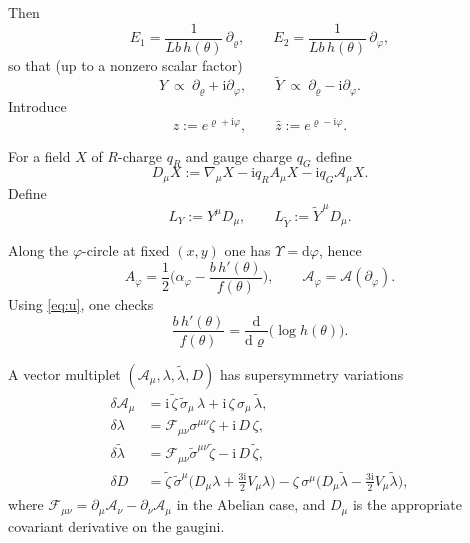 \documentclass[11pt,a4paper]{article}
\numberwithin{equation}{section}
\theoremstyle{plain}
\theoremstyle{definition}
\theoremstyle{remark}
\newcommand{\ii}{\mathrm{i}}
\newcommand{\dd}{\mathrm{d}}
\newcommand{\nn}{\nonumber}
\begin{document}
Then
\[
E_1=\frac{1}{L b\,h(\theta)}\,\partial_\varrho,
\qquad
E_2=\frac{1}{L b\,h(\theta)}\,\partial_\varphi,
\]
so that (up to a nonzero scalar factor)
\begin{equation}
Y \ \propto\ \partial_\varrho+\ii\partial_\varphi,
\qquad
\widetilde Y \ \propto\ \partial_\varrho-\ii\partial_\varphi.
\label{eq:Ydir}
\end{equation}
Introduce
\begin{equation}
z:=e^{\varrho+\ii\varphi},\qquad \bar z:=e^{\varrho-\ii\varphi}.
\label{eq:z}
\end{equation}

For a field $X$ of $R$-charge $q_R$ and gauge charge $q_G$ define
\begin{equation}
D_\mu X := \nabla_\mu X - \ii q_R A_\mu X - \ii q_G \mathcal A_\mu X.
\label{eq:Dmu}
\end{equation}
Define
\begin{equation}
L_Y := Y^\mu D_\mu,
\qquad
L_{\widetilde Y} := \widetilde Y^{\,\mu} D_\mu.
\label{eq:LY}
\end{equation}

Along the $\varphi$-circle at fixed $(x,y)$ one has $\Upsilon=\dd\varphi$, hence
\begin{equation}
A_\varphi
=
\frac12\Big(\alpha_\varphi-\frac{b\,h'(\theta)}{f(\theta)}\Big),
\qquad
\mathcal A_\varphi = \mathcal A(\partial_\varphi).
\label{eq:Aphi}
\end{equation}
Using \eqref{eq:u}, one checks
\begin{equation}
\frac{b\,h'(\theta)}{f(\theta)}
=
\frac{\dd}{\dd\varrho}\big(\log h(\theta)\big).
\label{eq:cotidentity}
\end{equation}


A vector multiplet $(\mathcal A_\mu,\lambda,\widetilde\lambda,D)$ has supersymmetry variations
\begin{align}
\delta \mathcal A_\mu &= \ii\,\widetilde\zeta\,\widetilde\sigma_\mu\,\lambda+\ii\,\zeta\,\sigma_\mu\,\widetilde\lambda,
\nn\\
\delta\lambda &= \mathcal F_{\mu\nu}\sigma^{\mu\nu}\zeta+\ii\,D\,\zeta,
\nn\\
\delta\widetilde\lambda &= \mathcal F_{\mu\nu}\widetilde\sigma^{\mu\nu}\widetilde\zeta-\ii\,D\,\widetilde\zeta,
\nn\\
\delta D &= \widetilde\zeta\,\widetilde\sigma^\mu\Big(D_\mu\lambda+\frac{3\ii}{2}V_\mu\lambda\Big)
-\zeta\,\sigma^\mu\Big(D_\mu\widetilde\lambda-\frac{3\ii}{2}V_\mu\widetilde\lambda\Big),
\label{eq:vm-susy}
\end{align}
where $\mathcal F_{\mu\nu}=\partial_\mu \mathcal A_\nu-\partial_\nu \mathcal A_\mu$ in the Abelian case, and $D_\mu$ is the appropriate covariant derivative on the gaugini.
\end{document}
